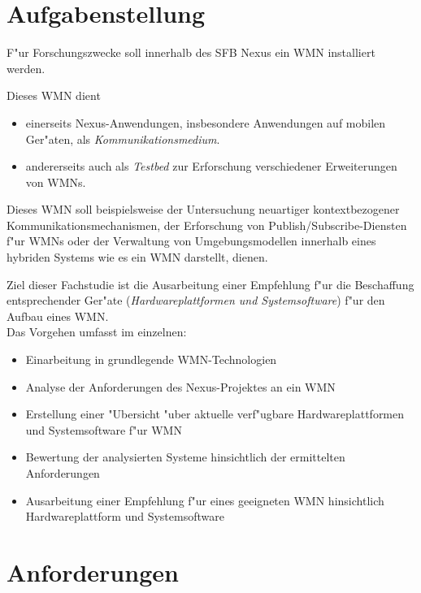 \section{Aufgabenstellung}

F"ur Forschungszwecke soll innerhalb des SFB Nexus \cite{nexus}
ein WMN installiert werden. 

Dieses WMN dient 
\begin{itemize}
	\item einerseits Nexus-Anwendungen, insbesondere Anwendungen 
	auf mobilen Ger"aten, als \emph{Kommunikationsmedium}. 

	\item andererseits auch als \emph{Testbed} 
	zur Erforschung verschiedener Erweiterungen von WMNs.
\end{itemize}

Dieses WMN soll beispielsweise der Untersuchung neuartiger kontextbezogener 
Kommunikationsmechanismen, der Erforschung von 
Publish/Subscribe-Diensten f"ur WMNs oder der 
Verwaltung von Umgebungsmodellen innerhalb eines 
hybriden Systems wie es ein WMN darstellt, dienen.

Ziel dieser Fachstudie ist die Ausarbeitung einer 
Empfehlung f"ur die Beschaffung entsprechender Ger"ate 
(\emph{Hardwareplattformen und Systemsoftware}) f"ur
den Aufbau eines WMN. \\

Das Vorgehen umfasst im einzelnen:

\begin{itemize}
	
	\item Einarbeitung in grundlegende WMN-Technologien
	\item Analyse der Anforderungen des Nexus-Projektes an ein WMN
	\item Erstellung einer "Ubersicht "uber aktuelle verf"ugbare 
	Hardwareplattformen und Systemsoftware f"ur WMN
	\item Bewertung der analysierten Systeme hinsichtlich 
	der ermittelten Anforderungen 	
	\item Ausarbeitung einer Empfehlung f"ur eines geeigneten 
	WMN hinsichtlich Hardwareplattform und Systemsoftware
	
\end{itemize}


\section{Anforderungen}

